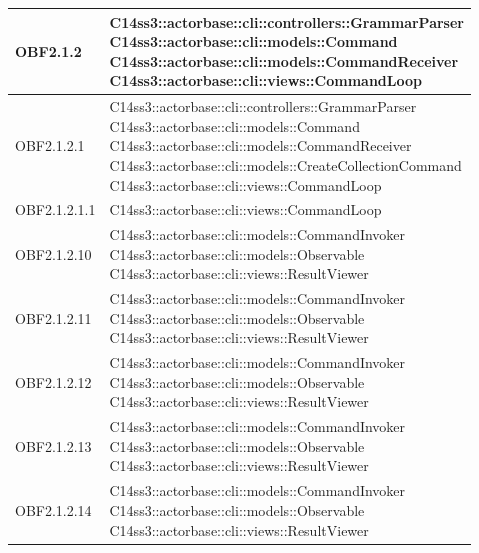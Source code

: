 \documentclass{scalatekids-article}
\begin{document}
\begin{longtable}[H]{|p{4.5cm}|p{13cm}|}
\hline
OBF2.1.2 & \multiLineCell[t]{C14ss3::actorbase::cli::controllers::GrammarParser\\C14ss3::actorbase::cli::models::Command\\C14ss3::actorbase::cli::models::CommandReceiver\\C14ss3::actorbase::cli::views::CommandLoop\\}\\
\hline
OBF2.1.2.1 & \multiLineCell[t]{C14ss3::actorbase::cli::controllers::GrammarParser\\C14ss3::actorbase::cli::models::Command\\C14ss3::actorbase::cli::models::CommandReceiver\\C14ss3::actorbase::cli::models::CreateCollectionCommand\\C14ss3::actorbase::cli::views::CommandLoop\\}\\
\hline
OBF2.1.2.1.1 & \multiLineCell[t]{C14ss3::actorbase::cli::views::CommandLoop\\}\\
\hline
OBF2.1.2.10 & \multiLineCell[t]{C14ss3::actorbase::cli::models::CommandInvoker\\C14ss3::actorbase::cli::models::Observable\\C14ss3::actorbase::cli::views::ResultViewer\\}\\
\hline
OBF2.1.2.11 & \multiLineCell[t]{C14ss3::actorbase::cli::models::CommandInvoker\\C14ss3::actorbase::cli::models::Observable\\C14ss3::actorbase::cli::views::ResultViewer\\}\\
\hline
OBF2.1.2.12 & \multiLineCell[t]{C14ss3::actorbase::cli::models::CommandInvoker\\C14ss3::actorbase::cli::models::Observable\\C14ss3::actorbase::cli::views::ResultViewer\\}\\
\hline
OBF2.1.2.13 & \multiLineCell[t]{C14ss3::actorbase::cli::models::CommandInvoker\\C14ss3::actorbase::cli::models::Observable\\C14ss3::actorbase::cli::views::ResultViewer\\}\\
\hline
OBF2.1.2.14 & \multiLineCell[t]{C14ss3::actorbase::cli::models::CommandInvoker\\C14ss3::actorbase::cli::models::Observable\\C14ss3::actorbase::cli::views::ResultViewer\\}\\

\end{longtable}
\end{document}
